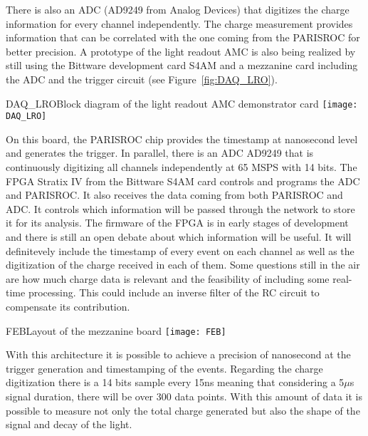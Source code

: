 There is also an ADC (AD9249 from Analog Devices) that digitizes the charge information for every channel independently. The charge measurement provides information that can be correlated with the one coming from the PARISROC for better precision. A prototype of the light readout AMC is also being realized by still using the Bittware development card S4AM and a mezzanine card including the ADC and the trigger circuit (see Figure~\ref{fig:DAQ_LRO}). 


\begin{cdrfigure}{DAQ_LRO}{Block diagram of the light readout AMC demonstrator card}
 \texttt{[image: DAQ\_LRO]}  
\end{cdrfigure}

On this board, the PARISROC chip provides the timestamp at nanosecond level and generates the trigger. In parallel, there is an ADC AD9249 that is continuously digitizing all channels independently at 65 MSPS with 14 bits. The FPGA Stratix IV from the Bittware S4AM card controls and programs the ADC and PARISROC. It also receives the data coming from both PARISROC and ADC. It controls which information will be passed through the network to store it for its analysis. The firmware of the FPGA is in early stages of development and there is still an open debate about which information will be useful. It will definitevely include the timestamp of every event on each channel as well as the digitization of the charge received in each of them. Some questions still in the air are how much charge data is relevant and the feasibility of including some real-time processing. This could include an inverse filter of the RC circuit to compensate its contribution. 

\begin{cdrfigure}{FEB}{Layout of the mezzanine board}
 \texttt{[image: FEB]}  
\end{cdrfigure}
 
With this architecture it is possible to achieve a precision of nanosecond at the trigger generation and timestamping of the events. Regarding the charge digitization there is a 14 bits sample every 15ns meaning that considering a 5$\mu$s signal duration, there will be over 300 data points. With this amount of data it is possible to measure not only the total charge generated but also the shape of the signal and decay of the light.
